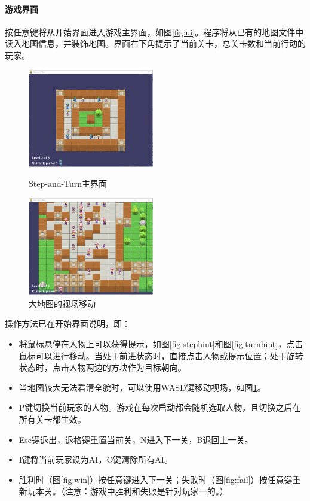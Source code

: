 \paragraph{游戏界面}
按任意键将从开始界面进入游戏主界面，如图\ref{fig:ui}。程序将从已有的地图文件中读入地图信息，并装饰地图。界面右下角提示了当前关卡，总关卡数和当前行动的玩家。

\begin{figure}[htbp]
\begin{minipage}[t]{0.5\linewidth}
	\centering
	\includegraphics[width=5.5cm]{pic/ui.png}
	\caption{Step-and-Turn主界面}
	\label{fig:ui}
\end{minipage}
\begin{minipage}[t]{0.5\linewidth}
	\centering
	\includegraphics[width=5.5cm]{pic/bigmap.png}
	\caption{大地图的视场移动}
	\label{fig:bigmap}
\end{minipage}
\end{figure}

操作方法已在开始界面说明，即：
\begin{itemize}
	\item 将鼠标悬停在人物上可以获得提示，如图\ref{fig:stephint}和图\ref{fig:turnhint}，点击鼠标可以进行移动。当处于前进状态时，直接点击人物或提示位置；处于旋转状态时，点击人物两边的方块作为目标朝向。
	\item 当地图较大无法看清全貌时，可以使用{\ttfamily WASD}键移动视场，如图\ref{fig:bigmap}。
	\item {\ttfamily P}键切换当前玩家的人物。游戏在每次启动都会随机选取人物，且切换之后在所有关卡都生效。
	\item {\ttfamily Esc}键退出，退格键重置当前关，{\ttfamily N}进入下一关，{\ttfamily B}退回上一关。
	\item {\ttfamily I}键将当前玩家设为AI，{\ttfamily O}键清除所有AI。
	\item 胜利时（图\ref{fig:win}）按任意键进入下一关；失败时（图\ref{fig:fail}）按任意键重新玩本关。（注意：游戏中胜利和失败是针对玩家一的。）
\end{itemize}


